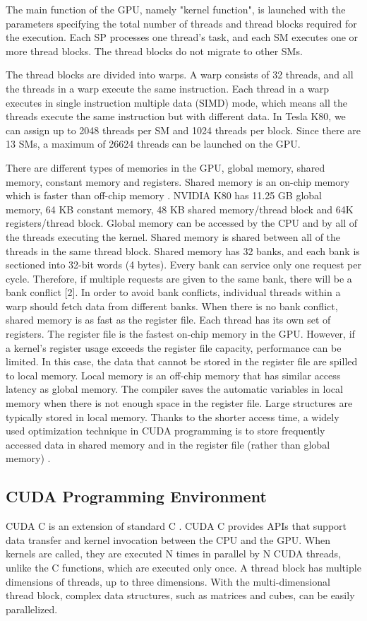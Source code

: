 The main function of the GPU, namely "kernel function", is launched with the parameters specifying the total number of threads and thread blocks required for the execution. Each SP processes one thread's task, and each SM executes one or more thread blocks. The thread blocks do not migrate to other SMs.

The thread blocks are divided into warps. A warp consists of 32 threads, and all the threads in a warp execute the same instruction. Each thread in a warp executes in single instruction multiple data (SIMD) mode, which means all the threads execute the same instruction but with different data. In Tesla K80, we can assign up to 2048 threads per SM and 1024 threads per block. Since there are 13 SMs, a maximum of 26624 threads can be launched on the GPU.

There are different types of memories in the GPU, global memory, shared memory, constant memory and registers. Shared memory is an on-chip memory which is faster than off-chip memory \cite{bib8}. NVIDIA K80 has 11.25 GB global memory, 64 KB constant memory, 48 KB shared memory/thread block and 64K registers/thread block. Global memory can be accessed by the CPU and by all of the threads executing the kernel. Shared memory is shared between all of the threads in the same thread block. Shared memory has 32 banks, and each bank is sectioned into 32-bit words (4 bytes). Every bank can service only one request per cycle. Therefore, if multiple requests are given to the same bank, there will be a bank conflict [2]. In order to avoid bank conflicts, individual threads within a warp should fetch data from different banks. When there is no bank conflict, shared memory is as fast as the register file. Each thread has its own set of registers. The register file is the fastest on-chip memory in the GPU. However, if a kernel's register usage exceeds the register file capacity, performance can be limited. In this case, the data that cannot be stored in the register file are spilled to local memory. Local memory is an off-chip memory that has similar access latency as global memory. The compiler saves the automatic variables in local memory when there is not enough space in the register file. Large structures are typically stored in local memory. Thanks to the shorter access time, a widely used optimization technique in CUDA programming is to store frequently accessed data in shared memory and in the register file (rather than global memory) \cite{bib14}.

\subsection{CUDA Programming Environment}
CUDA C is an extension of standard C \cite{bib5}. CUDA C provides APIs that support data transfer and kernel invocation between the CPU and the GPU. When kernels are called, they are executed N times in parallel by N CUDA threads, unlike the C functions, which are executed only once. A thread block has multiple dimensions of threads, up to three dimensions. With the multi-dimensional thread block, complex data structures, such as matrices and cubes, can be easily parallelized.

